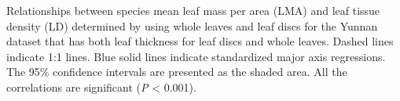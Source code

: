 \documentclass[
  12pt,
]{article}
\begin{document}
Relationships between species mean leaf mass per area (LMA) and leaf tissue density (LD) determined by using whole leaves and leaf discs for the Yunnan dataset that has both leaf thickness for leaf discs and whole leaves.
Dashed lines indicate 1:1 lines.
Blue solid lines indicate standardized major axis regressions.
The 95\% confidence intervals are presented as the shaded area.
All the correlations are significant (\emph{P} \textless{} 0.001).
\end{document}
